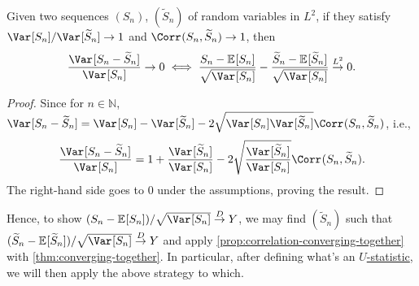 \begin{proposition}\label{prop:correlation-converging-together}
	Given two sequences \((S_n)\), \((\widetilde{S} _n)\) of random variables in \(L^2\), if they satisfy \(\Var_{}[S_n] / \Var_{}[\widetilde{S} _n] \to 1\) and \(\Corr_{}(S_n, \widetilde{S} _n) \to 1\), then
	\[
		\frac{\Var_{}[S_n - \widetilde{S} _n] }{\Var_{}[S_n] } \to 0
		\iff \frac{S_n - \mathbb{E}_{}[S_n] }{\sqrt{\Var_{}[S_n] } } - \frac{\widetilde{S} _n - \mathbb{E}_{}[\widetilde{S} _n] }{\sqrt{\Var_{}[S_n] } }
		\overset{L^2}{\to} 0.
	\]
\end{proposition}
\begin{proof}
	Since for \(n \in\mathbb{N} \), \(\Var_{}[S_n - \widetilde{S} _n] = \Var_{}[S_n] - \Var_{}[\widetilde{S} _n] - 2 \sqrt{\Var_{}[S_n] \Var_{}[\widetilde{S} _n] } \Corr_{}(S_n, \widetilde{S} _n)\), i.e.,
	\[
		\frac{\Var_{}[S_n - \widetilde{S} _n] }{\Var_{}[S_n] }
		= 1 + \frac{\Var_{}[\widetilde{S} _n] }{\Var_{}[S_n] } - 2 \sqrt{\frac{\Var_{}[\widetilde{S} _n] }{\Var_{}[S_n] }} \Corr_{}(S_n, \widetilde{S} _n).
	\]
	The right-hand side goes to \(0\) under the assumptions, proving the result.
\end{proof}

Hence, to show \((S_n - \mathbb{E}_{}[S_n] ) / \sqrt{\Var_{}[S_n] } \overset{D}{\to} Y\), we may find \((\widetilde{S} _n)\) such that \((\widetilde{S} _n - \mathbb{E}_{}[\widetilde{S} _n]) / \sqrt{\Var_{}[S_n] } \overset{D}{\to} Y\) and apply \autoref{prop:correlation-converging-together} with \autoref{thm:converging-together}. In particular, after defining what's an \hyperref[def:U-statistic]{\(U\)-statistic}, we will then apply the above strategy to which.